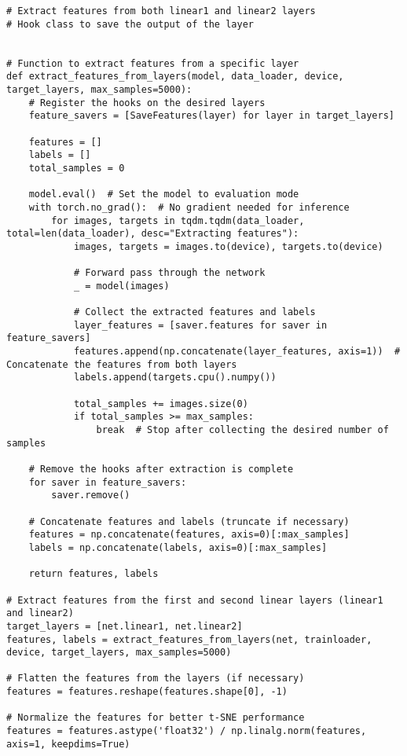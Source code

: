 \documentclass{article}
\begin{document}
\begin{enumerate}
\begin{verbatim}
# Extract features from both linear1 and linear2 layers
# Hook class to save the output of the layer


# Function to extract features from a specific layer
def extract_features_from_layers(model, data_loader, device, target_layers, max_samples=5000):
    # Register the hooks on the desired layers
    feature_savers = [SaveFeatures(layer) for layer in target_layers]
    
    features = []
    labels = []
    total_samples = 0
    
    model.eval()  # Set the model to evaluation mode
    with torch.no_grad():  # No gradient needed for inference
        for images, targets in tqdm.tqdm(data_loader, total=len(data_loader), desc="Extracting features"):
            images, targets = images.to(device), targets.to(device)
            
            # Forward pass through the network
            _ = model(images)
            
            # Collect the extracted features and labels
            layer_features = [saver.features for saver in feature_savers]
            features.append(np.concatenate(layer_features, axis=1))  # Concatenate the features from both layers
            labels.append(targets.cpu().numpy())
            
            total_samples += images.size(0)
            if total_samples >= max_samples:
                break  # Stop after collecting the desired number of samples
    
    # Remove the hooks after extraction is complete
    for saver in feature_savers:
        saver.remove()
    
    # Concatenate features and labels (truncate if necessary)
    features = np.concatenate(features, axis=0)[:max_samples]
    labels = np.concatenate(labels, axis=0)[:max_samples]
    
    return features, labels

# Extract features from the first and second linear layers (linear1 and linear2)
target_layers = [net.linear1, net.linear2]
features, labels = extract_features_from_layers(net, trainloader, device, target_layers, max_samples=5000)

# Flatten the features from the layers (if necessary)
features = features.reshape(features.shape[0], -1)

# Normalize the features for better t-SNE performance
features = features.astype('float32') / np.linalg.norm(features, axis=1, keepdims=True)


\end{verbatim}
\end{enumerate}
\end{document}
